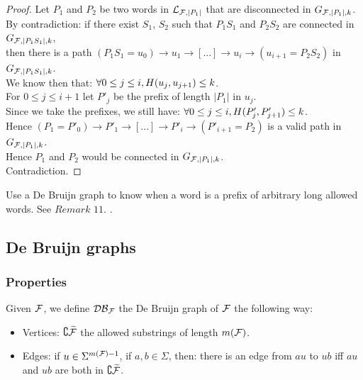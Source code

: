 \documentclass{article}
\begin{document}
\begin{proof}
	Let $P_1$ and $P_2$ be two words in $\mathcal{L}_{\mathcal{F}, |P_1|}$ that are disconnected in $G_{\mathcal{F}, |P_1|, k}$. \\
	By contradiction: if there exist $S_1$, $S_2$ such that $P_1 S_1$ and $P_2 S_2$ are connected in $G_{\mathcal{F}, |P_1 S_1|, k}$, \\
	then there is a path $(P_1 S_1 = u_0) \rightarrow u_1 \rightarrow [...] \rightarrow u_i \rightarrow (u_{i+1} = P_2 S_2)$ in $G_{\mathcal{F}, |P_1 S_1|, k}$. \\
	We know then that: $\forall 0 \leq j \leq i, H(u_j,u_{j+1}) \leq k$. \\
	For $0 \leq j \leq i+1$ let $P'_j$ be the prefix of length $|P_1|$ in $u_j$. \\
	Since we take the prefixes, we still have: $\forall 0 \leq j \leq i, H(P'_j,P'_{j+1}) \leq k$. \\
	Hence $(P_1 = P'_0) \rightarrow P'_1 \rightarrow [...] \rightarrow P'_i \rightarrow (P'_{i+1} = P_2)$ is a valid path in $G_{\mathcal{F}, |P_1|, k}$. \\
	Hence $P_1$ and $P_2$ would be connected in $G_{\mathcal{F}, |P_1|, k}$. \\
	Contradiction.
\end{proof}

\begin{idea*}
	Use a De Bruijn graph to know when a word is a prefix of arbitrary long allowed words. See $Remark$ $11.$ .
\end{idea*}

\subsection{De Bruijn graphs}

\subsubsection{Properties}

\begin{definition}
	Given $\mathcal{F}$, we define $\mathcal{DB}_{\mathcal{F}}$ the De Bruijn graph of $\mathcal{F}$ the following way:
	\begin{itemize}
		\item Vertices: $\complement {\widetilde{\mathcal{F}}}$ the allowed substrings of length $m(\mathcal{F})$.
		\item Edges: if $u \in \Sigma^{m(\mathcal{F})-1}$, if $a,b \in \Sigma$, then: there is an edge from $au$ to $ub$ iff $au$ and $ub$ are both in $\complement {\widetilde{\mathcal{F}}}$.
	\end{itemize}
\end{definition}
\end{document}
